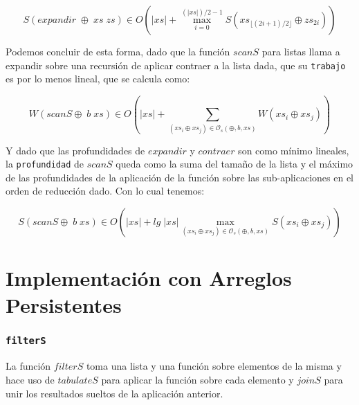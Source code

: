 \documentclass[a4paper,10pt]{article}
\begin{document}
\begin{equation*}
    S \left( expandir \;\oplus \;xs \;zs \right) \in
    O \left( \vert xs \vert + \max_{i=0}^{(\vert xs \vert)/2 - 1} S \left( xs_{\lfloor (2i+1)/2 \rfloor} \oplus zs_{2i} \right) \right)
\end{equation*}

\bigskip

    Podemos concluir de esta forma, dado que la función $scanS$ para listas llama a 
expandir sobre una recursión de aplicar contraer a la lista dada, que su \texttt{trabajo} 
es por lo menos lineal, que se calcula como:

\begin{equation*}
    W \left( scanS \oplus \; b \; xs \right) \in
    O \left( \vert xs \vert + \sum_{(xs_i \oplus xs_j) \in \mathcal{O}_s(\oplus,b,xs)} W \left( xs_i \oplus xs_j \right) \right)
\end{equation*}

    Y dado que las profundidades de $expandir$ y $contraer$ son como mínimo lineales,
la \texttt{profundidad} de $scanS$ queda como la suma del tamaño de la lista y el
máximo de las profundidades de la aplicación de la función sobre las sub-aplicaciones
en el orden de reducción dado. Con lo cual tenemos:

\begin{equation*}
    S \left( scanS \oplus \; b \; xs \right) \in
    O \left( \vert xs \vert +  lg \;\vert xs \vert \max_{(xs_i \oplus xs_j) \in \mathcal{O}_s(\oplus,b,xs)} S \left( xs_i \oplus xs_j \right) \right)
\end{equation*}





\bigskip
\newpage{}





\part*{Implementación con Arreglos Persistentes}

\section*{\texttt{filterS}}

    La función $filterS$ toma una lista y una función sobre elementos de la misma
y hace uso de $tabulateS$ para aplicar la función sobre cada elemento y $joinS$ para
unir los resultados sueltos de la aplicación anterior.\\

\begin{scriptsize}\end{scriptsize}
\end{document}
